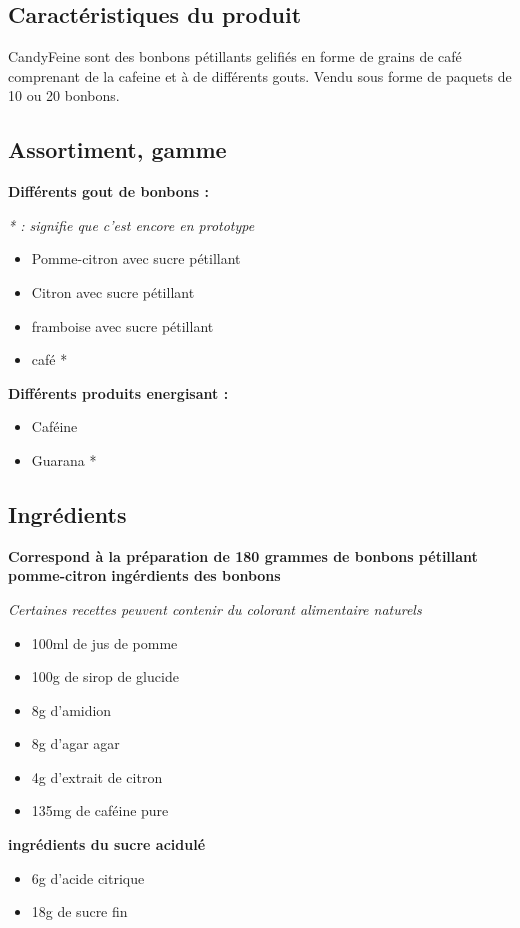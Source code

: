 \documentclass[12pt]{article}
\begin{document}
\subsection{Caractéristiques du produit}
CandyFeine sont des bonbons pétillants gelifiés en forme de grains de café comprenant de la cafeine et à de différents gouts.
Vendu sous forme de paquets de 10 ou 20 bonbons.
\subsection{Assortiment, gamme}
\textbf{Différents gout de bonbons :}

\textit{* : signifie que c'est encore en prototype}
\begin{itemize}
 \item Pomme-citron avec sucre pétillant
 \item Citron avec sucre pétillant
 \item framboise avec sucre pétillant
 \item café *
\end{itemize}

\textbf{Différents produits energisant :}
\begin{itemize}
 \item Caféine
 \item Guarana *
\end{itemize}

\subsection{Ingrédients}
\textbf{Correspond à la préparation de 180 grammes de bonbons pétillant pomme-citron}
\textbf{ingérdients des bonbons}

\textit{Certaines recettes peuvent contenir du colorant alimentaire naturels}
\begin{itemize}
 \item 100ml de jus de pomme
 \item 100g de sirop de glucide
 \item 8g d'amidion
 \item 8g d'agar agar
 \item 4g d'extrait de citron
 \item 135mg de caféine pure
\end{itemize}

\textbf{ingrédients du sucre acidulé}
\begin{itemize}
 \item 6g d'acide citrique
 \item 18g de sucre fin
\end{itemize}
\end{document}
